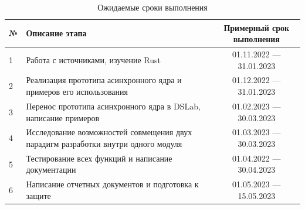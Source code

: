 \begin{table}[!h]
	\centering
\begin{tabular}{|l|p{27em}|c|}
	\hline
№	& Описание этапа &  Примерный срок выполнения \\
	\hline
	1 & Работа с источниками, изучение Rust &  01.11.2022 --- 31.01.2023\\ 
	\hline
2 & Реализация прототипа асинхронного ядра и примеров его использования & 01.12.2022 --- 31.01.2023 \\
	\hline
3	& Перенос прототипа асинхронного ядра в DSLab, написание примеров &  01.02.2023 --- 30.03.2023 \\
\hline
4	& Исследование возможностей совмещения двух парадигм разработки внутри одного модуля &  01.03.2023 --- 30.03.2023 \\
	\hline
5	& Тестирование всех функций и написание документации &  01.04.2022 --- 30.04.2023  \\
	\hline
6	& Написание отчетных документов и подготовка к защите & 01.05.2023 --- 15.05.2023 \\
	\hline
\end{tabular}
	\caption{Ожидаемые сроки выполнения}
	\label{table1}
\end{table}

